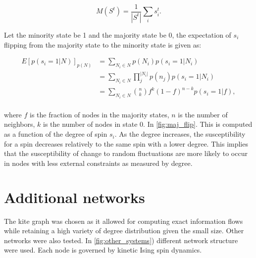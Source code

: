 \documentclass[a4paper, 11pt, twocolumn]{article}
\begin{document}
\[M(S^t) = \frac{1}{|S^t|} \sum_i s_i^t.\]

Let the minority state be 1 and the majority state be 0, the expectation
of \(s_i\) flipping from the majority state to the minority state is
given as:

\begin{equation}
\label{eq:majority_flip}
\begin{split}
E[ p(s_i = 1 | N ) ]_{p(N)} &= \sum_{N_i \in N} p(N_i) p(s_i = 1 | N_i)\\
            &= \sum_{N_i \in  N} \prod_j^{|N_i|} p(n_j) p(s_i  = 1 |N_i)\\
            &=  \sum_{N_i \in N}  {n\choose k} f^k  (1  -
            f)^{n-k}  p(s_i  = 1 | f), \\
\end{split}
\end{equation}

where \(f\) is the fraction of nodes in the majority states, \(n\) is
the number of neighbors, \(k\) is the number of nodes in state 0. In
\cref{fig:maj_flip}. This is computed as a function
of the degree of spin \(s_i\). As the degree increases, the
susceptibility for a spin decreases relatively to the same spin with a
lower degree. This implies that the susceptibility of change to random
fluctuations are more likely to occur in nodes with less external
constraints as measured by degree.

\section{Additional networks}
\label{additional-networks}
The kite graph was chosen as it allowed for computing exact information
flows while retaining a high variety of degree distribution given the
small size. Other networks were also tested. In
\cref{fig:other_systems}) different network structure
were used. Each node is governed by kinetic Ising spin dynamics.
\end{document}
